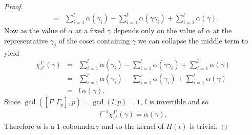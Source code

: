 \begin{proof}
\begin{eqnarray*}
	&=& \sum_{i = 1}^l\alpha(\gamma_i) - \sum_{i = 1}^l \alpha(\gamma\gamma_i) +\sum_{i = 1}^l \alpha(\gamma).
\end{eqnarray*}
Now as the value of $\alpha$ at a fixed $\gamma$ depends only on the value of $\alpha$ at the representative $\gamma_j$ of the coset containing $\gamma$ we can collapse the middle term to yield
\begin{eqnarray*}
	\chi_{v^*}^\Gamma(\gamma) 
	&=& \sum_{i = 1}^l\alpha(\gamma_i) - \sum_{i = 1}^l \alpha(\gamma\gamma_i) +\sum_{i = 1}^l \alpha(\gamma)\\
	&=& \sum_{i = 1}^l\alpha(\gamma_i) - \sum_{i = 1}^l \alpha(\gamma_i) +\sum_{i = 1}^l \alpha(\gamma) \\
	&=& l\, \alpha(\gamma).
\end{eqnarray*}
Since $\gcd([\Gamma:\Gamma_p], p) = \gcd(l,p) = 1$, $l$ is invertible and so
\begin{eqnarray*}
	l^{-1}\chi_{v^*}^\Gamma(\gamma) = \alpha(\gamma).
\end{eqnarray*}
Therefore $\alpha$ is a 1-coboundary and so the kernel of $H(\iota)$ is trivial.
\end{proof}

